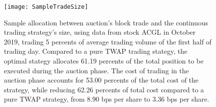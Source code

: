 
\begin{figure}[h]
  \texttt{[image: SampleTradeSize]}
  \caption{Sample allocation between auction's block trade and the continuous trading strategy's size, using data from stock ACGL in October 2019, trading 5 percents of average trading volume of the first half of trading day. Compared to a pure TWAP trading stategy, the optimal stategy allocates 61.19 percents of the total position to be executed during the auction phase. The cost of trading in the auction phase accounts for 53.00 percents of the total cost of the strategy, while reducing 62.26 percents of total cost compared to a pure TWAP strategy, from 8.90 bps per share to 3.36 bps per share.}
  \label{fig:optimal_sizes}
\end{figure}

